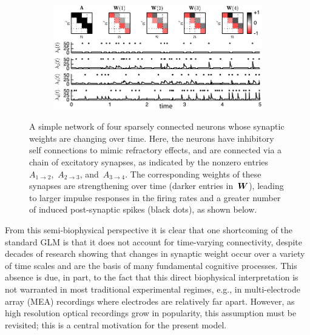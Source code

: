 \begin{figure}[t!]
  \centering%
  \vspace{-0.5em}
  \begin{subfigure}[T]{5.25in}
    \includegraphics[width=\textwidth]{figures/ch4/figure1}    
\end{subfigure}
\caption{A simple network of four sparsely connected neurons whose synaptic weights are changing over time. Here, the neurons have inhibitory self connections to mimic refractory effects, and are connected via a chain of excitatory synapses, as indicated by the nonzero entries~$A_{1\to 2}$,~$A_{2 \to 3}$, and~$A_{3\to 4}$. The corresponding weights of these synapses are strengthening over time (darker entries in~$\boldsymbol{W}$), leading to larger impulse responses in the firing rates and a greater number of induced post-synaptic spikes (black dots), as shown below.}
\label{fig:model_illustration}
\end{figure}

From this semi-biophysical perspective it is clear that one shortcoming of the standard GLM is that it does not account for time-varying connectivity, despite decades of research showing that changes in synaptic weight occur over a variety of time scales and are the basis of many fundamental cognitive processes. This absence is due, in part, to the fact that this direct biophysical interpretation is not warranted in most traditional experimental regimes, e.g., in multi-electrode array (MEA) recordings where electrodes are relatively far apart.  However, as high resolution optical recordings grow in popularity, this assumption must be revisited; this is a central motivation for the present model.

